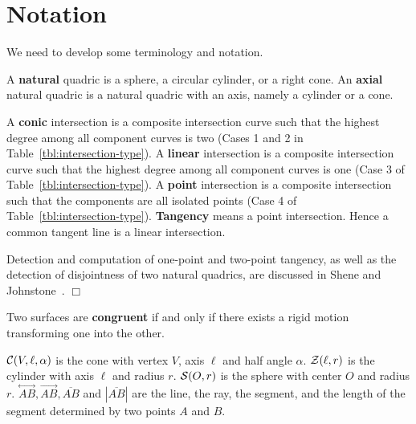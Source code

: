 
\section{Notation}
\label{section:notation}

     We need to develop some terminology and notation.

\begin{definition}
     A {\bf natural} quadric is a sphere, a circular cylinder, or a right cone.
An {\bf axial} natural quadric is a
natural quadric with an axis, namely a cylinder or a cone.
\end{definition}

\begin{definition}
     A {\bf conic} intersection is a composite intersection curve such that
the highest degree among all component curves is two (Cases 1 and 2 in
Table~\ref{tbl:intersection-type}).  A {\bf linear} intersection is a
composite intersection curve such that the highest degree among all component
curves is one (Case 3 of Table~\ref{tbl:intersection-type}).  A {\bf point}
intersection is a composite intersection such that the components are all
isolated points (Case 4 of Table~\ref{tbl:intersection-type}).  {\bf Tangency}
means a point intersection.  Hence a common tangent line is a linear
intersection.
\end{definition}

\begin{remark} \rm
Detection and computation of one-point and two-point tangency, as well
as the detection of disjointness of two natural quadrics, are discussed
in Shene and Johnstone~\cite{shene-johnstone:1991a,shene-johnstone:1991c}.
$\Box$
\end{remark}

\begin{definition}
     Two surfaces are {\bf congruent} if and only if there exists a rigid
motion transforming one into the other.
\end{definition}

 ${\cal C}(V,\ell,\alpha)$
is the cone with vertex $V$, axis $\ell$ and half angle $\alpha$.
${\cal Z}(\ell,r)$ is the cylinder with axis $\ell$ and radius $r$.
${\cal S}(O,r)$ is the sphere with center $O$ and radius $r$.
$\stackrel{\longleftrightarrow}{AB},
          \stackrel{\longrightarrow}{AB},\overline{AB}$ and
          $|\overline{AB}|$ are the line, the ray, the segment, and the
          length of the segment determined by two points $A$ and $B$.

